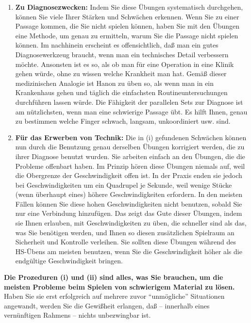 \begin{enumerate}[label={\roman*.}] 
\item \textbf{Zu Diagnosezwecken:} Indem Sie diese Übungen systematisch durchgehen, können Sie viele Ihrer Stärken und Schwächen erkennen.
Wenn Sie zu einer Passage kommen, die Sie nicht spielen können, haben Sie mit den Übungen eine Methode, um genau zu ermitteln, warum Sie die Passage nicht spielen können.
Im nachhinein erscheint es offensichtlich, daß man ein gutes Diagnosewerkzeug braucht, wenn man ein technisches Detail verbessern möchte.
Ansonsten ist es so, als ob man für eine Operation in eine Klinik gehen würde, ohne zu wissen welche Krankheit man hat.
Gemäß dieser medizinischen Analogie ist Hanon zu üben so, als wenn man in ein Krankenhaus gehen und täglich die einfachsten Routineuntersuchungen durchführen lassen würde.
Die Fähigkeit der parallelen Sets zur Diagnose ist am nützlichsten, wenn man eine schwierige Passage übt.
Es hilft Ihnen, genau zu bestimmen welche Finger schwach, langsam, unkoordiniert usw. sind.


\item \textbf{Für das Erwerben von Technik:} Die in (i) gefundenen Schwächen können nun durch die Benutzung genau derselben Übungen korrigiert werden, die zu ihrer Diagnose benutzt wurden.
Sie arbeiten einfach an den Übungen, die die Probleme offenbart haben.
Im Prinzip hören diese Übungen niemals auf, weil die Obergrenze der Geschwindigkeit offen ist.
In der Praxis enden sie jedoch bei Geschwindigkeiten um ein Quadrupel je Sekunde, weil wenige Stücke (wenn überhaupt eines) höhere Geschwindigkeiten erfordern.
In den meisten Fällen können Sie diese hohen Geschwindigkeiten nicht benutzen, sobald Sie nur eine Verbindung hinzufügen.
Das zeigt das Gute dieser Übungen, indem sie Ihnen erlauben, mit Geschwindigkeiten zu üben, die schneller sind als das, was Sie benötigen werden, und Ihnen so diesen zusätzlichen Spielraum an Sicherheit und Kontrolle verleihen.
Sie sollten diese Übungen während des HS-Übens am meisten benutzen, wenn Sie die Geschwindigkeit höher als die endgültige Geschwindigkeit bringen.


\end{enumerate}
\textbf{Die Prozeduren (i) und (ii) sind alles, was Sie brauchen, um die meisten Probleme beim Spielen von schwierigem Material zu lösen.}
Haben Sie sie erst erfolgreich auf mehrere zuvor \enquote{unmögliche} Situationen angewandt, werden Sie die Gewißheit erlangen, daß -- innerhalb eines vernünftigen Rahmens -- nichts unbezwingbar ist.

